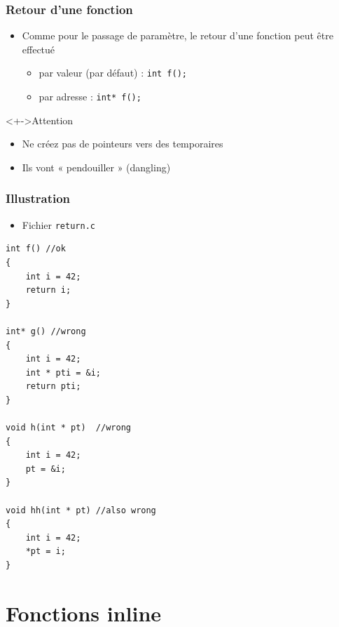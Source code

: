 \begin{frame}
\frametitle{Retour d'une fonction}
\begin{itemize}[<+->]
\item Comme pour le passage de paramètre, le retour d'une fonction peut être effectué
	\begin{itemize}
	\item par valeur (par défaut) : \lstinline|int f();|
	\item par adresse : \lstinline|int* f();|
	\end{itemize}
\end{itemize}
\begin{alertblock}<+->{Attention}
	\begin{itemize}[<+->]
	\item Ne créez pas de pointeurs vers des temporaires
	\item Ils vont « pendouiller » (dangling)
	\end{itemize}
\end{alertblock}
\end{frame}

\begin{frame}[containsverbatim]
\frametitle{Illustration}
\begin{itemize}
\item Fichier \texttt{return.c}
\end{itemize}
\begin{lstlisting}
int f() //ok
{
    int i = 42;
    return i;
}

int* g() //wrong
{
    int i = 42;
    int * pti = &i;
    return pti;
}

void h(int * pt)  //wrong
{
    int i = 42;
    pt = &i;
}

void hh(int * pt) //also wrong
{
    int i = 42;
    *pt = i;
}
\end{lstlisting}
\end{frame}

\section{Fonctions inline}

